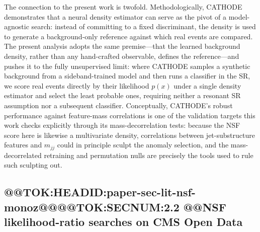 \documentclass[11pt]{article}
\begin{document}
The connection to the present work is twofold. Methodologically, CATHODE demonstrates that a neural density estimator can serve as the pivot of a model-agnostic search: instead of committing to a fixed discriminant, the density is used to generate a background-only reference against which real events are compared. The present analysis adopts the same premise---that the learned background density, rather than any hand-crafted observable, defines the reference---and pushes it to the fully unsupervised limit: where CATHODE samples a synthetic background from a sideband-trained model and then runs a classifier in the SR, we score real events directly by their likelihood $p(x)$ under a single density estimator and select the least probable ones, requiring neither a resonant SR assumption nor a subsequent classifier. Conceptually, CATHODE's robust performance against feature-mass correlations is one of the validation targets this work checks explicitly through its mass-decorrelation tests: because the NSF score here is likewise a multivariate density, correlations between jet-substructure features and $m_{jj}$ could in principle sculpt the anomaly selection, and the mass-decorrelated retraining and permutation nulls are precisely the tools used to rule such sculpting out.

\subsection{@@TOK:HEADID:paper-sec-lit-nsf-monoz@@@@TOK:SECNUM:2.2 @@NSF likelihood-ratio searches on CMS Open Data}
\end{document}
